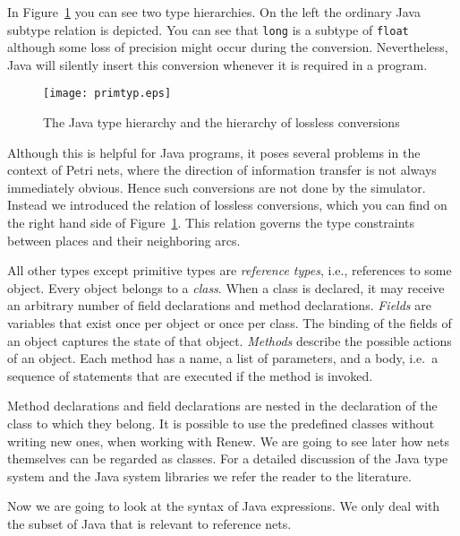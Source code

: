 In Figure~\ref{fig:primtyp} you can see two type hierarchies.
On the left the ordinary Java subtype relation is depicted.
You can see that \texttt{long} is a subtype of \texttt{float}
although some loss of precision might occur during the conversion.
Nevertheless, Java will silently insert this conversion whenever
it is required in a program.

\begin{figure}[tbp]
  \centerline{%
    \texttt{[image: primtyp.eps]}%
    }
  \caption{\label{fig:primtyp}The Java type hierarchy and the hierarchy
    of lossless conversions}
\end{figure}%

Although this is helpful for Java programs, it poses
several problems in the context of Petri nets, where the
direction of information transfer is not always immediately
obvious. Hence such conversions are not done by the simulator.
Instead we introduced the relation of lossless conversions,
which you can find on the right hand side of
Figure~\ref{fig:primtyp}. This relation governs the
type constraints between places and their neighboring arcs.

All other types except primitive types
are \emph{reference types}, i.e., references to some
object. Every object belongs to a \emph{class}. When a class is declared,
it may receive an arbitrary number of field declarations and
method declarations. \emph{Fields} are variables that exist once per
object or once per class. The binding of the fields of an object
captures the state of that object.
\emph{Methods} describe the possible actions of an object.
Each method has a name, a list of parameters, and a body, i.e.~a
sequence of statements that are executed if the method is invoked.


Method declarations and field declarations are nested in the
declaration of the class to which they belong. It is possible to use
the predefined classes without writing new ones, when working with
Renew. We are going to see later how nets themselves can be regarded as
classes. For a detailed
discussion of the Java type system and the Java system libraries
we refer the reader to the literature.

Now we are going to look at the syntax of Java expressions. We only
deal with the subset of Java that is relevant to reference nets.

